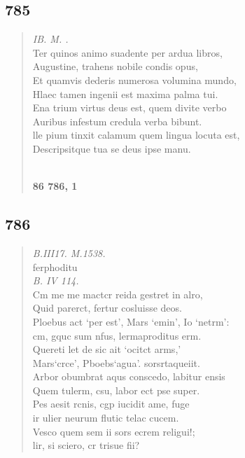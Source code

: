 \documentclass[11pt, a4paper]{report}
\begin{document}
            \subsection*{785}
      \begin{verse}
      \textit{IB. M. .} \\ Ter quinos animo suadente per ardua libros, \\ Augustine, trahens nobile condis opus, \\ Et quamvis dederis numerosa volumina mundo, \\ Hlaec tamen ingenii est maxima palma tui. \\ Ena trium virtus deus est, quem divite verbo \\ Auribus infestum credula verba bibunt. \\ lle pium tinxit calamum quem lingua locuta est, \\ Descripsitque tua se deus ipse manu. \\ 
        ﻿\pagebreak 
     \marginpar{[265]} \begin{center} \textbf{86 786, 1} \end{center}
      \end{verse}
  
            \subsection*{786}
      \begin{verse}
      \textit{B.III17. M.1538.} \\ ferphoditu \\ \textit{B. IV 114.} \\ Cm me me mactcr reida gestret in alro, \\ Quid parerct, fertur cosluisse deos. \\ Ploebus act ‘per est’, Mars ‘emin’, Io ‘netrm’: \\ cm, gquc sum nfus, lermaproditus erm. \\ Quereti let de sic ait ‘ocitct arms,’ \\ Mars‘crce’, Pboebs‘agua’. sorsrtaqueiit. \\ Arbor obumbrat aqus conscedo, labitur ensis \\ Quem tulerm, csu, labor ect pse super. \\ Pes aesit rcnis, cgp iucidit ame, fuge \\ ir ulier neurum flutic telac cucem. \\ Vesco quem sem ii sors ecrem religui!; \\ lir, si sciero, cr trisue fii? \\ 
      \end{verse}
  
\end{document}
